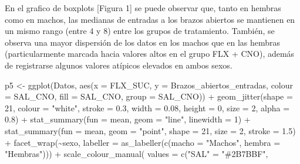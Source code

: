 \documentclass[
  letterpaper,
  DIV=11,
  numbers=noendperiod]{scrartcl}
\newenvironment{Shaded}{\begin{snugshade}}{\end{snugshade}}
\newcommand{\AttributeTok}[1]{\textcolor[rgb]{0.40,0.45,0.13}{#1}}
\newcommand{\DecValTok}[1]{\textcolor[rgb]{0.68,0.00,0.00}{#1}}
\newcommand{\FloatTok}[1]{\textcolor[rgb]{0.68,0.00,0.00}{#1}}
\newcommand{\FunctionTok}[1]{\textcolor[rgb]{0.28,0.35,0.67}{#1}}
\newcommand{\NormalTok}[1]{\textcolor[rgb]{0.00,0.23,0.31}{#1}}
\newcommand{\OtherTok}[1]{\textcolor[rgb]{0.00,0.23,0.31}{#1}}
\newcommand{\SpecialCharTok}[1]{\textcolor[rgb]{0.37,0.37,0.37}{#1}}
\newcommand{\StringTok}[1]{\textcolor[rgb]{0.13,0.47,0.30}{#1}}
\begin{document}
En el grafico de boxplots {[}Figura 1{]} se puede observar que, tanto en
hembras como en machos, las medianas de entradas a los brazos abiertos
se mantienen en un mismo rango (entre 4 y 8) entre los grupos de
tratamiento. También, se observa una mayor dispersión de los datos en
los machos que en las hembras (particularmente marcada hacia valores
altos en el grupo FLX + CNO), además de registrarse algunos valores
atípicos elevados en ambos sexos.

\begin{Shaded}
\begin{Highlighting}[]
\NormalTok{p5 }\OtherTok{\textless{}{-}} \FunctionTok{ggplot}\NormalTok{(Datos, }\FunctionTok{aes}\NormalTok{(}\AttributeTok{x =}\NormalTok{ FLX\_SUC,}
                        \AttributeTok{y =}\NormalTok{ Brazos\_abiertos\_entradas,}
                        \AttributeTok{colour =}\NormalTok{ SAL\_CNO,}
                        \AttributeTok{fill =}\NormalTok{ SAL\_CNO,}
                        \AttributeTok{group =}\NormalTok{ SAL\_CNO)) }\SpecialCharTok{+}
  \FunctionTok{geom\_jitter}\NormalTok{(}\AttributeTok{shape =} \DecValTok{21}\NormalTok{,}
              \AttributeTok{colour =} \StringTok{"white"}\NormalTok{,}
              \AttributeTok{stroke =} \FloatTok{0.3}\NormalTok{,}
              \AttributeTok{width =} \FloatTok{0.08}\NormalTok{,}
              \AttributeTok{height =} \DecValTok{0}\NormalTok{,}
              \AttributeTok{size =} \DecValTok{2}\NormalTok{,}
              \AttributeTok{alpha =} \FloatTok{0.8}\NormalTok{) }\SpecialCharTok{+}
  \FunctionTok{stat\_summary}\NormalTok{(}\AttributeTok{fun =}\NormalTok{ mean, }\AttributeTok{geom =} \StringTok{"line"}\NormalTok{, }\AttributeTok{linewidth =} \DecValTok{1}\NormalTok{) }\SpecialCharTok{+}
  \FunctionTok{stat\_summary}\NormalTok{(}\AttributeTok{fun =}\NormalTok{ mean, }\AttributeTok{geom =} \StringTok{"point"}\NormalTok{,}
               \AttributeTok{shape =} \DecValTok{21}\NormalTok{, }\AttributeTok{size =} \DecValTok{2}\NormalTok{, }\AttributeTok{stroke =} \FloatTok{1.5}\NormalTok{) }\SpecialCharTok{+}
  \FunctionTok{facet\_wrap}\NormalTok{(}\SpecialCharTok{\textasciitilde{}}\NormalTok{sexo,}
             \AttributeTok{labeller =} \FunctionTok{as\_labeller}\NormalTok{(}\FunctionTok{c}\NormalTok{(}\AttributeTok{macho =} \StringTok{"Machos"}\NormalTok{,}
                                      \AttributeTok{hembra =} \StringTok{"Hembras"}\NormalTok{))) }\SpecialCharTok{+}
  \FunctionTok{scale\_colour\_manual}\NormalTok{(}
    \AttributeTok{values =} \FunctionTok{c}\NormalTok{(}\StringTok{"SAL"} \OtherTok{=} \StringTok{"\#2B7BBF"}\NormalTok{,}

\end{Highlighting}
\end{Shaded}
\end{document}
